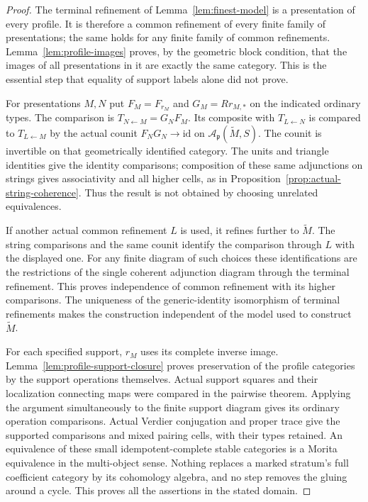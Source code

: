 \documentclass[11pt]{article}
\theoremstyle{definition}
\theoremstyle{remark}
\begin{document}
\begin{proof}
The terminal refinement of Lemma~\ref{lem:finest-model} is a
presentation of every profile.  It is therefore a common refinement
of every finite family of presentations; the same holds for any
finite family of common refinements.  Lemma~\ref{lem:profile-images}
proves, by the geometric block condition, that the images of all
presentations in it are exactly the same category.  This is the
essential step that equality of support labels alone did not prove.

For presentations $M,N$ put $F_M=F_{r_M}$ and $G_M=Rr_{M,*}$
on the indicated ordinary types.  The comparison is
$T_{N\leftarrow M}=G_NF_M$.  Its composite with
$T_{L\leftarrow N}$ is compared to $T_{L\leftarrow M}$ by the actual
counit $F_NG_N\to\mathrm{id}$ on
$\mathcal A_{\mathfrak p}(\widetilde M,S)$.
The counit is invertible on that geometrically identified category.
The units and triangle identities give the identity comparisons;
composition of these same adjunctions on strings gives associativity
and all higher cells, as in Proposition~\ref{prop:actual-string-coherence}.
Thus the result is not obtained by choosing unrelated equivalences.

If another actual common refinement $L$ is used, it refines further
to $\widetilde M$.  The string comparisons and the same counit identify
the comparison through $L$ with the displayed one.  For any finite
diagram of such choices these identifications are the restrictions
of the single coherent adjunction diagram through the terminal
refinement.  This proves independence of common refinement with
its higher comparisons.  The uniqueness of the generic-identity
isomorphism of terminal refinements makes the construction independent
of the model used to construct $\widetilde M$.

For each specified support, $r_M$ uses its complete inverse image.
Lemma~\ref{lem:profile-support-closure} proves preservation of the
profile categories by the support operations themselves.
Actual support squares and their localization connecting maps were
compared in the pairwise theorem.  Applying the argument simultaneously
to the finite support diagram gives its ordinary operation comparisons.
Actual Verdier conjugation and proper trace give the supported
comparisons and mixed pairing cells, with their types retained.
An equivalence of these small idempotent-complete stable categories
is a Morita equivalence in the multi-object sense.  Nothing replaces
a marked stratum's full coefficient category by its cohomology algebra,
and no step removes the gluing around a cycle.  This proves all the
assertions in the stated domain.
\end{proof}
\end{document}
